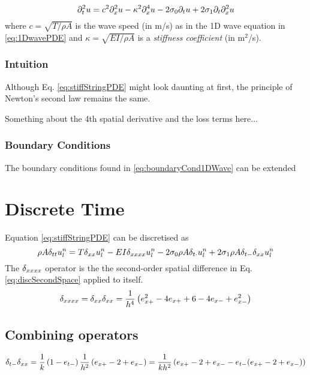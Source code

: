 \begin{equation}
    \partial_t^2 u = c^2 \partial_x^2 u - \kappa^2 \partial_x^4 u - 2 \sigma_{0} \partial_t u + 2 \sigma_{1} \partial_t \partial_x^2 u
\end{equation}
where $c=\sqrt{T/\rho A}$ is the wave speed  (in m/s) as in the 1D wave equation in \eqref{eq:1DwavePDE} and $\kappa = \sqrt{EI / \rho A}$ is a \textit{stiffness coefficient} (in m$^2$/s).

\subsubsection{Intuition}
Although Eq. \eqref{eq:stiffStringPDE} might look daunting at first, the principle of Newton's second law remains the same. 

Something about the 4th spatial derivative and the loss terms here...

\subsubsection{Boundary Conditions}
The boundary conditions found in \eqref{eq:boundaryCond1DWave} can be extended 

\section{Discrete Time}
Equation \eqref{eq:stiffStringPDE} can be discretised as 
\begin{equation}\label{eq:stiffStringPDE}
    \rho A \delta_{tt} u_l^n = T \delta_{xx} u_l^n - EI \delta_{xxxx} u_l^n - 2 \sigma_{0} \rho A \delta_{t\cdot} u_l^n + 2 \sigma_{1} \rho A \delta_{t-}\delta_{xx} u_l^n
\end{equation}
The $\delta_{xxxx}$ operator is the  the second-order spatial difference in Eq. \eqref{eq:discSecondSpace} applied to itself. 
\begin{equation}
    \delta_{xxxx} = \delta_{xx}\delta_{xx} = \frac{1}{h^4}\left(e_{x+}^2 - 4e_{x+}+6 - 4e_{x-}+e_{x-}^2\right)
\end{equation}

\subsection{Combining operators}\label{sec:combiningOperators}
\begin{align*}
    \delta_{t-}\delta_{xx} = \frac{1}{k}\left(1-e_{t-}\right)\frac{1}{h^2}\left(e_{x+}-2+e_{x-}\right) = \frac{1}{kh^2}\left(e_{x+}-2+e_{x-} - e_{t-}(e_{x+}-2+e_{x-})\right)
\end{align*}

